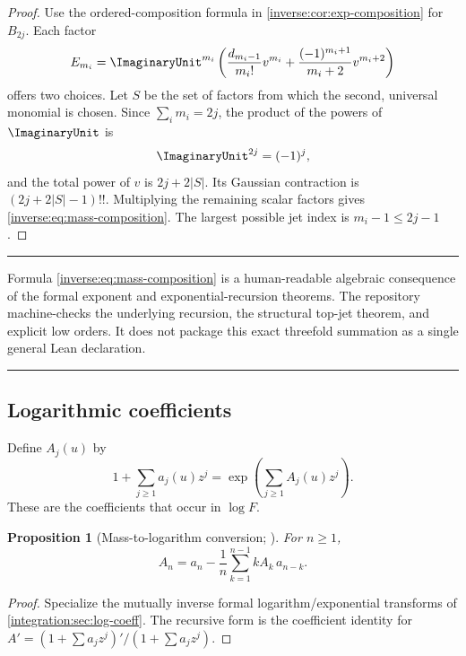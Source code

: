 \documentclass[11pt,oneside]{article}
\newtheorem{proposition}[proposition]{Proposition}
\theoremstyle{definition}
\theoremstyle{remark}
\newenvironment{boxedremark}{%
  \par\smallskip\noindent\begin{center}\begin{minipage}{0.94\textwidth}%
  \color{black}\hrule\vspace{0.6em}\small
}{%
  \vspace{0.6em}\hrule\end{minipage}\end{center}\smallskip
}
\begin{document}
\begin{proof}
Use the ordered-composition formula in
\cref{inverse:cor:exp-composition} for $B_{2j}$.  Each factor
\[
 E_{m_i}
 =\ImaginaryUnit^{m_i}\left(
   \frac{d_{m_i-1}}{m_i!}v^{m_i}
   +\frac{(-1)^{m_i+1}}{m_i+2}v^{m_i+2}
 \right)
\]
offers two choices.  Let $S$ be the set of factors from which the second,
universal monomial is chosen.  Since $\sum_i m_i=2j$, the product of the
powers of $\ImaginaryUnit$ is
\[
 \ImaginaryUnit^{2j}=(-1)^j,
\]
and the total power of $v$ is $2j+2|S|$.  Its Gaussian contraction is
$(2j+2|S|-1)!!$.  Multiplying the remaining scalar factors gives
\eqref{inverse:eq:mass-composition}.  The largest possible jet index is
$m_i-1\leq2j-1$.
\end{proof}

\begin{boxedremark}
Formula \eqref{inverse:eq:mass-composition} is a human-readable algebraic
consequence of the formal exponent and exponential-recursion theorems.
The repository machine-checks the underlying recursion, the structural
top-jet theorem, and explicit low orders.  It does not package this exact
threefold summation as a single general Lean declaration.
\end{boxedremark}

\subsection{Logarithmic coefficients}

Define $A_j(u)$ by
\begin{equation}
 1+\sum_{j\geq1}a_j(u)z^j
 =\exp\!\left(\sum_{j\geq1}A_j(u)z^j\right).
 \label{inverse:eq:log-coeff-definition}
\end{equation}
These are the coefficients that occur in $\log F$.

\begin{proposition}[Mass-to-logarithm conversion; \Formalized]
\label{inverse:prop:log-recursion}
For $n\geq1$,
\begin{equation}
 A_n
 =a_n-\frac1n\sum_{k=1}^{n-1}kA_k\,a_{n-k}.
 \label{inverse:eq:A-recursion}
\end{equation}
\end{proposition}

\begin{proof}
Specialize the mutually inverse formal logarithm/exponential transforms of
\cref{integration:sec:log-coeff}.  The recursive form is the coefficient identity for
\(A'=(1+\sum a_jz^j)'/(1+\sum a_jz^j)\).
\end{proof}
\end{document}
